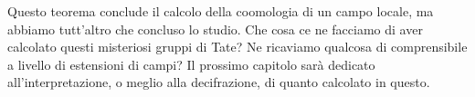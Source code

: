 Questo teorema conclude il calcolo della coomologia di un campo locale, ma abbiamo tutt'altro che concluso lo studio. Che cosa ce ne facciamo di aver calcolato questi misteriosi gruppi di Tate? Ne ricaviamo qualcosa di comprensibile a livello di estensioni di campi? Il prossimo capitolo sarà dedicato all'interpretazione, o meglio alla decifrazione, di quanto calcolato in questo.
